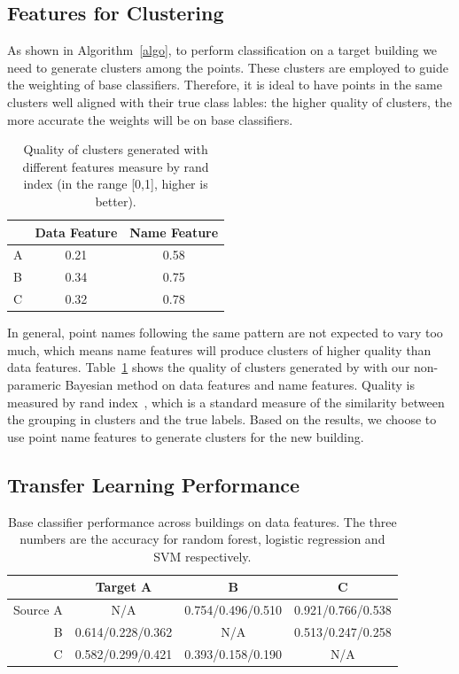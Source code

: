 \subsection{Features for Clustering}
As shown in Algorithm~\ref{algo}, to perform classification on a target building we need to generate clusters among the points.
These clusters are employed to guide the weighting of base classifiers. Therefore, it is ideal to have points in the same clusters 
well aligned with their true class lables: the higher quality of clusters, the more accurate the weights will be on base classifiers.


\begin{table}[h]
\centering
\begin{tabular}{l|c|c}
\hline
                & Data Feature & Name Feature \\ \hline
A & 0.21       & 0.58       \\
B & 0.34       & 0.75       \\
C & 0.32       & 0.78       \\ \hline
\end{tabular}
\caption{Quality of clusters generated with different features measure by rand index (in the range [0,1], higher is better).}
\label{quality}
\end{table}


In general, point names following the same pattern are not expected to vary too much, which means name features will produce clusters of higher quality than data features.
Table~\ref{quality} shows the quality of clusters generated by with our non-parameric Bayesian method on data features and name features. 
Quality is measured by rand index~\cite{rand}, which is a standard measure of the similarity between the grouping in clusters and the true labels.
Based on the results, we choose to use point name features to generate clusters for the new building. 


\subsection{Transfer Learning Performance}
\begin{table}[]
\centering
\begin{tabular}{r|c|c|c}
\hline
 & Target A     & B     & C     \\ \hline
Source A & N/A   & 0.754/0.496/0.510 & 0.921/0.766/0.538 \\ \hline
B & 0.614/0.228/0.362 & N/A   & 0.513/0.247/0.258 \\ \hline
C & 0.582/0.299/0.421 & 0.393/0.158/0.190 & N/A   \\ \hline
\end{tabular}
\caption{Base classifier performance across buildings on data features. The three numbers are the accuracy for random forest, logistic regression and SVM respectively.}
\label{acc_base}
\end{table}


